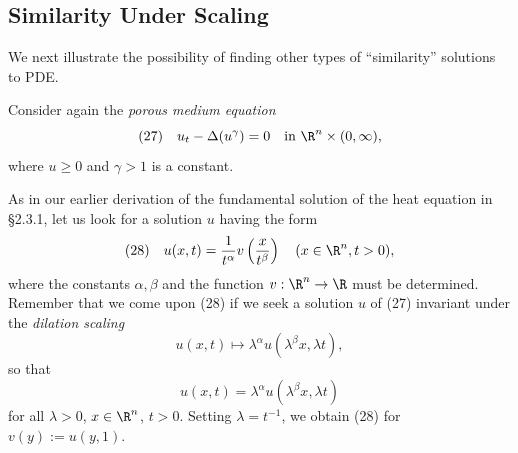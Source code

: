 \subsection{Similarity Under Scaling}
\label{sec:similarity-under-scaling}

We next illustrate the possibility of finding other types of ``similarity'' solutions to PDE.

\begin{example}
\label{ex:porous-medium-scaling-invariant-barenblatt}
Consider again the \textit{porous medium equation}
$$(27) \quad u_t - \Delta(u^\gamma) = 0 \quad \text{in } \R^n \times (0, \infty),$$
where $u \ge 0$ and $\gamma > 1$ is a constant.

As in our earlier derivation of the fundamental solution of the heat equation in \S2.3.1, let us look for a solution $u$ having the form
$$(28) \quad u(x,t) = \frac{1}{t^\alpha} v\left(\frac{x}{t^\beta}\right) \quad (x \in \R^n, t > 0),$$
where the constants $\alpha, \beta$ and the function $v : \R^n \to \R$ must be determined. Remember that we come upon (28) if we seek a solution $u$ of (27) invariant under the \textit{dilation scaling}
$$u(x,t) \mapsto \lambda^\alpha u(\lambda^\beta x, \lambda t),$$
so that
$$u(x,t) = \lambda^\alpha u(\lambda^\beta x, \lambda t)$$
for all $\lambda>0$, $x\in\R^n$, $t>0$. Setting $\lambda = t^{-1}$, we obtain (28) for $v(y) := u(y,1)$.


\end{example}

